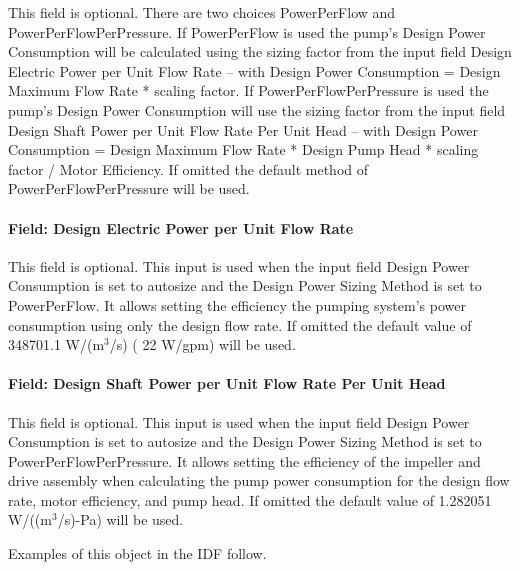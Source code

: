 This field is optional. There are two choices PowerPerFlow and PowerPerFlowPerPressure. If PowerPerFlow is used the pump's Design Power Consumption will be calculated using the sizing factor from the input field Design Electric Power per Unit Flow Rate -- with Design Power Consumption = Design Maximum Flow Rate * scaling factor. If PowerPerFlowPerPressure is used the pump's Design Power Consumption will use the sizing factor from the input field Design Shaft Power per Unit Flow Rate Per Unit Head -- with Design Power Consumption = Design Maximum Flow Rate * Design Pump Head * scaling factor / Motor Efficiency. If omitted the default method of PowerPerFlowPerPressure will be used.

\paragraph{Field: Design Electric Power per Unit Flow Rate}\label{field-design-electric-power-per-unit-flow-rate-1}

This field is optional. This input is used when the input field Design Power Consumption is set to autosize and the Design Power Sizing Method is set to PowerPerFlow. It allows setting the efficiency the pumping system's power consumption using only the design flow rate. If omitted the default value of 348701.1 W/(m\(^{3}\)/s) ( 22 W/gpm) will be used.

\paragraph{Field: Design Shaft Power per Unit Flow Rate Per Unit Head}\label{field-design-shaft-power-per-unit-flow-rate-per-unit-head-2}

This field is optional. This input is used when the input field Design Power Consumption is set to autosize and the Design Power Sizing Method is set to PowerPerFlowPerPressure. It allows setting the efficiency of the impeller and drive assembly when calculating the pump power consumption for the design flow rate, motor efficiency, and pump head. If omitted the default value of 1.282051 W/((m\(^{3}\)/s)-Pa) will be used.

Examples of this object in the IDF follow.

